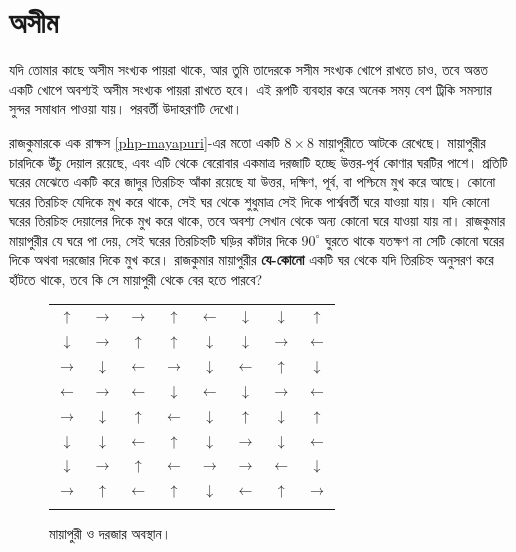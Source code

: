\section{\texorpdfstring{অসীম \phpname}{অসীম পিজিয়নহোল প্রিন্সিপল}}
যদি তোমার কাছে অসীম সংখ্যক পায়রা থাকে, আর তুমি তাদেরকে সসীম সংখ্যক খোপে রাখতে চাও, তবে অন্তত একটি খোপে অবশ্যই অসীম সংখ্যক পায়রা রাখতে হবে। \phpnamer{} এই রূপটি ব্যবহার করে অনেক সময় বেশ ট্রিকি সমস্যার সুন্দর সমাধান পাওয়া যায়। পরবর্তী উদাহরণটি দেখো।

\begin{example}
	রাজকুমারকে এক রাক্ষস \autoref{php-mayapuri}-এর মতো একটি $8\times8$ মায়াপুরীতে আটকে রেখেছে। মায়াপুরীর চারদিকে উঁচু দেয়াল রয়েছে, এবং এটি থেকে বেরোবার একমাত্র দরজাটি হচ্ছে উত্তর-পূর্ব কোণার ঘরটির পাশে। প্রতিটি ঘরের মেঝেতে একটি করে জাদুর তিরচিহ্ন আঁকা রয়েছে যা উত্তর, দক্ষিণ, পূর্ব, বা পশ্চিমে মুখ করে আছে। কোনো ঘরের তিরচিহ্ন যেদিকে মুখ করে থাকে, সেই ঘর থেকে শুধুমাত্র সেই দিকে পার্শ্ববর্তী ঘরে যাওয়া যায়। যদি কোনো ঘরের তিরচিহ্ন দেয়ালের দিকে মুখ করে থাকে, তবে অবশ্য সেখান থেকে অন্য কোনো ঘরে যাওয়া যায় না। রাজকুমার মায়াপুরীর যে ঘরে পা দেয়, সেই ঘরের তিরচিহ্নটি ঘড়ির কাঁটার দিকে $90^\circ$ ঘুরতে থাকে যতক্ষণ না সেটি কোনো ঘরের দিকে অথবা দরজাের দিকে মুখ করে। রাজকুমার মায়াপুরীর \textbf{যে-কোনো} একটি ঘর থেকে যদি তিরচিহ্ন অনুসরণ করে হাঁটতে থাকে, তবে কি সে মায়াপুরী থেকে বের হতে পারবে?
\end{example}
\begin{figure}[h]
\centering
\bgroup
\def\arraystretch{1.6}
\begin{tabular}{||c|c|c|c|c|c|c|c||}
\hhline{|t:========:t|}
$\uparrow$& $\rightarrow$ & $\rightarrow$&$\uparrow$& $\leftarrow$& $\downarrow$&$\downarrow$ & \multicolumn{1}{c}{$\uparrow$} \\
\hhline{||--------||}
$\downarrow$  & $\rightarrow$ & $\uparrow$    & $\uparrow$    & $\downarrow$  & $\downarrow$  & $\rightarrow$ & $\leftarrow$\\
\hhline{||--------||}
$\rightarrow$ & $\downarrow$  & $\leftarrow$  & $\rightarrow$ & $\downarrow$  & $\leftarrow$  & $\uparrow$    & $\downarrow$ \\
\hhline{||--------||}
$\leftarrow$  & $\rightarrow$ & $\leftarrow$  & $\downarrow$  & $\leftarrow$  & $\downarrow$  & $\rightarrow$ & $\leftarrow$ \\
\hhline{||--------||}
$\rightarrow$ & $\downarrow$  & $\uparrow$    & $\leftarrow$  & $\downarrow$  & $\uparrow$    & $\downarrow$  & $\uparrow$ \\
\hhline{||--------||}
$\downarrow$  & $\downarrow$  & $\leftarrow$  & $\uparrow$    & $\downarrow$  & $\rightarrow$ & $\downarrow$  & $\leftarrow$ \\
\hhline{||--------||}
$\downarrow$  & $\rightarrow$ & $\uparrow$    & $\leftarrow$  & $\rightarrow$ & $\rightarrow$ & $\leftarrow$  & $\downarrow$  \\
\hhline{||--------||}
$\rightarrow$ & $\uparrow$    & $\leftarrow$  & $\uparrow$    & $\downarrow$  & $\leftarrow$  & $\uparrow$    & $\rightarrow$\\
\hhline{|b:========:b|}
\end{tabular}
\egroup
\caption{মায়াপুরী ও দরজার অবস্থান।}
\label{php-mayapuri}
\end{figure}
